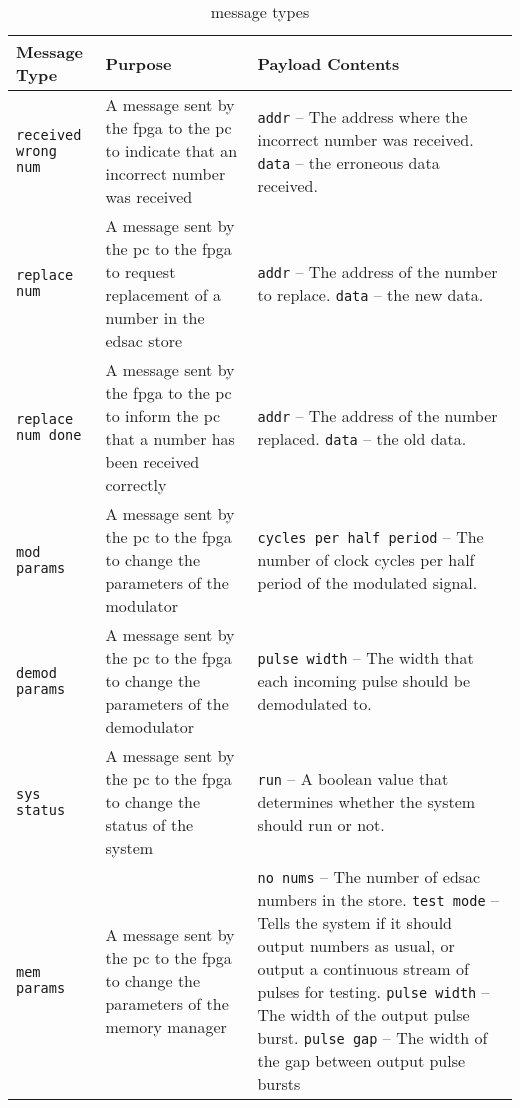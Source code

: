 \begin{longtable}{>{\raggedright}p{}  >{\raggedright}p{} >{\raggedright}p{} }
	
	\caption{ message types}\label{tbl:msg-types}\tabularnewline
	
	\toprule
	
	Message Type & Purpose & Payload Contents \tabularnewline
	
	\midrule
	
	\endhead %
	
	\bottomrule
	
	\endfoot
		
		\texttt{received wrong num} & A message sent by the \gls{fpga} to the \gls{pc} to indicate that an incorrect number was received & \texttt{addr} -- The address where the incorrect number was received. \texttt{data} -- the erroneous data received. \tabularnewline
		


	\texttt{replace num} & A message sent by the \gls{pc} to the \gls{fpga} to request replacement of a number in the \gls{edsac} store & \texttt{addr} -- The address of the number to replace. \texttt{data} -- the new data. \tabularnewline
	


		\texttt{replace num done} & A message sent by the \gls{fpga} to the \gls{pc} to inform the \gls{pc} that a number has been received correctly & \texttt{addr} -- The address of the number replaced. \texttt{data} -- the old data. \tabularnewline
		
		


\texttt{mod params} & A message sent by the \gls{pc} to the \gls{fpga} to change the parameters of the modulator & \texttt{cycles per half period} -- The number of clock cycles per half period of the modulated signal. \tabularnewline



\texttt{demod params} & A message sent by the \gls{pc} to the \gls{fpga} to change the parameters of the demodulator & \texttt{pulse width} -- The width that each incoming pulse should be demodulated to. \tabularnewline


\texttt{sys status} & A message sent by the \gls{pc} to the \gls{fpga} to change the status of the system& \texttt{run} -- A boolean value that determines whether the system should run or not. \tabularnewline


\texttt{mem params} & A message sent by the \gls{pc} to the \gls{fpga} to change the parameters of the memory manager& \texttt{no nums} -- The number of \gls{edsac} numbers in the store. \texttt{test mode} -- Tells the system if it should output numbers as usual, or output a continuous stream of pulses for testing. \texttt{pulse width} -- The width of the output pulse burst. \texttt{pulse gap} -- The width of the gap between output pulse bursts \tabularnewline



\end{longtable}
